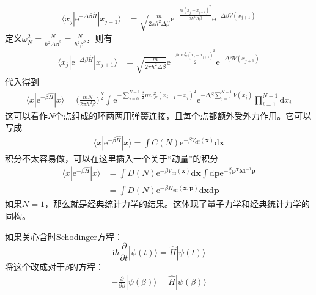 \documentclass[12pt]{article}
\begin{document}
    \begin{align*}
        \langle x_j|\mathrm{e}^{-\Delta \beta \hat{H}} |x_{j+1} \rangle &= \sqrt{\frac m{2\pi \hbar^2 \Delta \beta}} \mathrm{e}^{-\frac {m(x_j- x_{j+1})^2}{2\hbar^2 \Delta \beta}} \mathrm{e}^{-\Delta \beta V(x_{j+1})}
    \end{align*}
    定义$\omega_N^2 = \frac N{\hbar^2 \Delta \beta^2} = \frac N{\hbar^2 \beta^2}$，则有
    \begin{align*}
        \langle x_j|\mathrm{e}^{-\Delta \beta \hat{H}} |x_{j+1} \rangle &= \sqrt{\frac m{2\pi \hbar^2 \Delta \beta}} \mathrm{e}^{-\frac {\beta m\omega_N^2(x_j- x_{j+1})^2}{2}} \mathrm{e}^{-\Delta \beta V(x_{j+1})}
    \end{align*}
    代入得到 
    \begin{align*}
        \langle x|\mathrm{e}^{-\beta \hat{H}}|x\rangle  = \bigg(\frac {mN}{2\pi \hbar^2 \beta}\bigg)^{\frac N2} \int \mathrm{e}^{-\sum_{j=0}^{N-1} \frac {\beta}2 m \omega_N^2 (x_{j+1} - x_j)^2} \mathrm{e}^{-\Delta \beta \sum_{j=0}^{N-1}V(x_j)}\prod_{i=1}^{N-1}\mathrm{d}x_i
    \end{align*}
    这可以看作$N$个点组成的环两两用弹簧连接，且每个点都额外受外力作用。它可以写成
    \begin{align*}
        \langle x|\mathrm{e}^{-\beta \hat{H}}|x\rangle  = \int C(N) \mathrm{e}^{-\beta V_{\mathrm{eff}}(\bm{x})} \mathrm{d}\bm{x}
    \end{align*}
    积分不太容易做，可以在这里插入一个关于“动量”的积分
    \begin{align*}
        \langle x|\mathrm{e}^{-\beta \hat{H}}|x\rangle  &= \int D(N) \mathrm{e}^{-\beta V_{\mathrm{eff}}(\bm{x})} \mathrm{d}\bm{x} \int \mathrm{d}\bm{p} \mathrm{e}^{-\frac {\beta}2 \bm{p}^{\mathrm{T}}\bm{M}^{-1} \bm{p}}\\
        &= \int D(N) \mathrm{e}^{-\beta H_{\mathrm{eff}}(\bm{x,p})} \mathrm{d}\bm{x} \mathrm{d}\bm{p}
    \end{align*}
    如果$N=1$，那么就是经典统计力学的结果。这体现了量子力学和经典统计力学的同构。

    如果关心含时Schodinger方程：
    \begin{equation*}
        \mathrm{i}\hbar \frac {\partial}{\partial t} | \psi(t) \rangle = \hat{H}|\psi(t) \rangle
    \end{equation*}
    将这个改成对于$\beta$的方程：
    \begin{align*}
        -\frac {\partial}{\partial \beta} |\psi(\beta) \rangle = \hat{H} |\psi(\beta) \rangle
    \end{align*}
\end{document}
